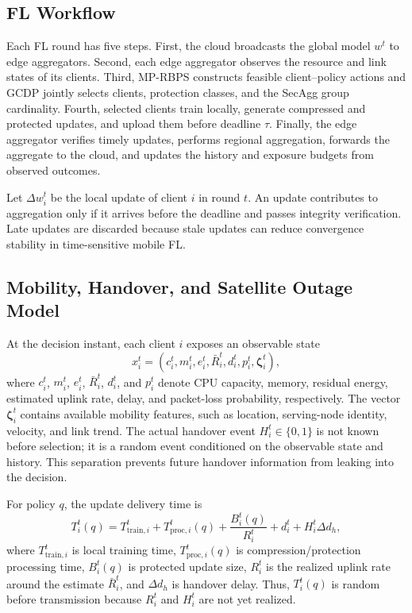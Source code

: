 \documentclass[preprint,12pt]{elsarticle}
\begin{document}
\subsection{FL Workflow}

Each FL round has five steps. First, the cloud broadcasts the global model $w^{t}$ to edge aggregators. Second, each edge aggregator observes the resource and link states of its clients. Third, MP-RBPS constructs feasible client--policy actions and GCDP jointly selects clients, protection classes, and the SecAgg group cardinality. Fourth, selected clients train locally, generate compressed and protected updates, and upload them before deadline $\tau$. Finally, the edge aggregator verifies timely updates, performs regional aggregation, forwards the aggregate to the cloud, and updates the history and exposure budgets from observed outcomes.

Let $\Delta w_i^t$ be the local update of client $i$ in round $t$. An update contributes to aggregation only if it arrives before the deadline and passes integrity verification. Late updates are discarded because stale updates can reduce convergence stability in time-sensitive mobile FL.

\subsection{Mobility, Handover, and Satellite Outage Model}

At the decision instant, each client $i$ exposes an observable state
\begin{equation}
	x_i^t = \left(c_i^t, m_i^t, e_i^t, \bar R_i^t, d_i^t, p_i^t, \boldsymbol{\zeta}_i^t\right),
\end{equation}
where $c_i^t$, $m_i^t$, $e_i^t$, $\bar R_i^t$, $d_i^t$, and $p_i^t$ denote CPU capacity, memory, residual energy, estimated uplink rate, delay, and packet-loss probability, respectively. The vector $\boldsymbol{\zeta}_i^t$ contains available mobility features, such as location, serving-node identity, velocity, and link trend. The actual handover event $H_i^t\in\{0,1\}$ is not known before selection; it is a random event conditioned on the observable state and history. This separation prevents future handover information from leaking into the decision.

For policy $q$, the update delivery time is
\begin{equation}
	T_i^t(q) =
	T_{\mathrm{train},i}^t
	+ T_{\mathrm{proc},i}^t(q)
	+ \frac{B_i^t(q)}{R_i^t}
	+ d_i^t
	+ H_i^t \Delta d_h,
	\label{eq:delivery_time}
\end{equation}
where $T_{\mathrm{train},i}^t$ is local training time, $T_{\mathrm{proc},i}^t(q)$ is compression/protection processing time, $B_i^t(q)$ is protected update size, $R_i^t$ is the realized uplink rate around the estimate $\bar R_i^t$, and $\Delta d_h$ is handover delay. Thus, $T_i^t(q)$ is random before transmission because $R_i^t$ and $H_i^t$ are not yet realized.
\end{document}
